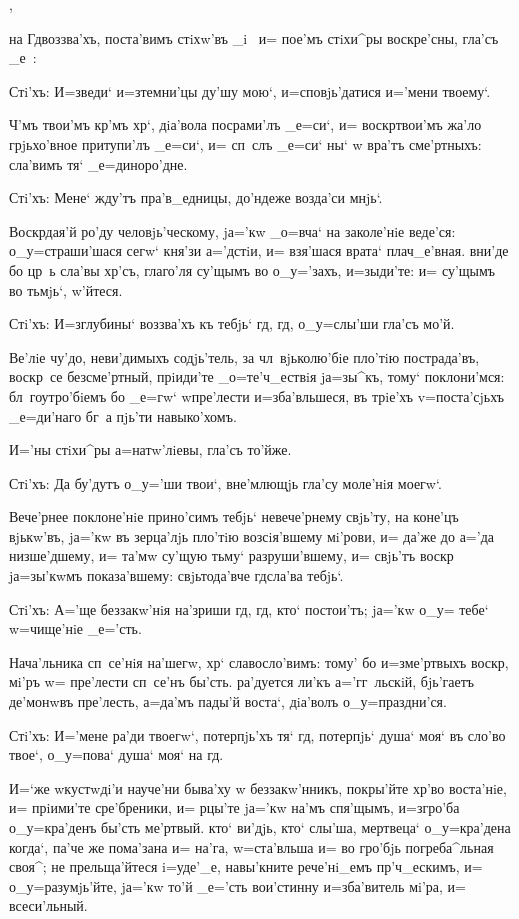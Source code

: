 ,

на Гд воззва'хъ, поста'вимъ стiхw'въ _i~ и= пое'мъ 
стiхи^ры воскре'сны, гла'съ _е~:

Стi'хъ: И=зведи` и=з\ъ темни'цы ду'шу мою`, 
и=сповjь'датися и='мени твоему`.

Ч'мъ твои'мъ кр'мъ хр`, дiа'вола 
посрами'лъ _е=си`, и= воскр твои'мъ жа'ло 
грjьхо'вное притупи'лъ _е=си`, и= сп~слъ _е=си` ны` w\т 
вра'тъ сме'ртныхъ: сла'вимъ тя` _е=диноро'дне. 

Стi'хъ: Мене` жду'тъ пра'в_едницы, до'ндеже возда'си 
мнjь`. 

Воскр дая'й ро'ду человjь'ческому, jа='кw _о=вча` 
на заколе'нiе веде'ся: о_у=страши'шася сегw` кня'зи 
а='дстiи, и= взя'шася врата` плач_е'вная. вни'де бо цр~ь 
сла'вы хр'съ, глаго'ля су'щымъ во о_у='захъ, 
и=зыди'те: и= су'щымъ во тьмjь`, w'йтеся.

Стi'хъ: И=з\ъ глубины` воззва'хъ къ тебjь` гд, 
гд, о_у=слы'ши гла'съ мо'й.

Ве'лiе чу'до, неви'димыхъ содjь'тель, за 
чл~вjьколю'бiе пло'тiю пострада'въ, воскр~се 
безсме'ртный, прiиди'те _о=те'ч_ествiя jа=зы^къ, тому` 
поклони'мся: бл~гоутро'бiемъ бо _е=гw` w\т пре'лести 
и=зба'вльшеся, въ трiе'хъ v=поста'сjьхъ _е=ди'наго бг~а 
пjь'ти навыко'хомъ. 

И='ны стiхи^ры а=натw'лiевы, гла'съ то'йже.

Стi'хъ: Да бу'дутъ о_у='ши твои`, вне'млющjь гла'су 
моле'нiя моегw`. 

Вече'рнее поклоне'нiе прино'симъ тебjь` невече'рнему 
свjь'ту, на коне'цъ вjькw'въ, jа='кw въ зерца'лjь пло'тiю 
возсiя'вшему мi'рови, и= да'же до а='да низше'дшему, и= 
та'мw су'щую тьму` разруши'вшему, и= свjь'тъ воскр 
jа=зы'кwмъ показа'вшему: свjьтода'вче гд сла'ва 
тебjь`.

Стi'хъ: А='ще беззакw'нiя на'зриши гд, гд, кто` 
постои'тъ; jа='кw о_у= тебе` w=чище'нiе _е='сть.

Нача'льника сп~се'нiя на'шегw, хр` славосло'вимъ: 
тому' бо и=з\ъ ме'ртвыхъ воскр, мi'ръ w= пре'лести 
сп~се'нъ бы'сть. ра'дуется ли'къ а='гг~льскiй, бjь'гаетъ 
де'монwвъ пре'лесть, а=да'мъ пады'й воста`, дiа'волъ 
о_у=праздни'ся.

Стi'хъ: И='мене ра'ди твоегw`, потерпjь'хъ тя` гд, 
потерпjь` душа` моя` въ сло'во твое`, о_у=пова` душа` 
моя` на гд.

И=`же w\т кустwдi'и науче'ни быва'ху w\т 
беззакw'нникъ, покры'йте хр'во воста'нiе, и= 
прiими'те сре'бреники, и= рцы'те jа='кw на'мъ спя'щымъ, 
и=з\ъ гро'ба о_у=кра'денъ бы'сть ме'ртвый. кто` ви'дjь, 
кто` слы'ша, мертвеца` о_у=кра'дена когда`, па'че же 
пома'зана и= на'га, w=ста'вльша и= во гро'бjь 
погреба^льная своя^; не прельща'йтеся i=уде'_е, 
навы'кните рече'нi_емъ пр'ч_ескимъ, и= 
о_у=разумjь'йте, jа='кw то'й _е='сть вои'стинну 
и=зба'витель мi'ра, и= всеси'льный.

